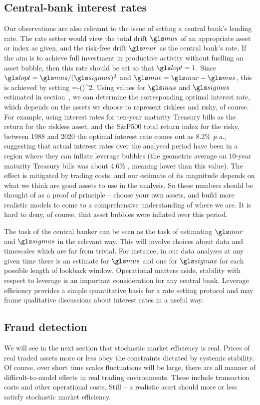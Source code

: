\subsection{Central-bank interest rates}
Our observations are also relevant to the issue of setting a central bank's lending rate. The rate setter would view the total drift $\mus$ of an appropriate asset or index as given, and the risk-free drift $\mur$ as the central bank's rate. If the aim is to achieve full investment in productive activity without fuelling an asset bubble, then this rate should be set so that $\lopt=1$. Since $\lopt=\mus/(\sigmas)^2$ and $\mue=\mur-\mus$, this is achieved by setting 
\be
\mur=\mus-(\sigmas)^2.
\ee
Using values for $\mus$ and $\sigmas$ estimated in section~, we can determine the corresponding optimal interest rate, which depends on the assets we choose to represent riskless and risky, of course. For example, using interest rates for ten-year maturity Treasury bills as the return for the riskless asset, and the S\&P500 total return index for the risky, between 1988 and 2020 the optimal interest rate comes out as 8.2\% {\it p.a.}, suggesting that actual interest rates over the analysed period have been in a region where they can inflate leverage bubbles (the geometric average on 10-year maturity Treasury bills was about 4.6\% \pa, meaning lower than this value). The effect is mitigated by trading costs, and our estimate of its magnitude depends on what we think are good assets to use in the analysis. So these numbers should be thought of as a proof of principle -- choose your own assets, and build more realistic models to come to a comprehensive understanding of where we are. It is hard to deny, of course, that asset bubbles were inflated over this period. 

The task of the central banker can be seen as the task of estimating $\mur$ and $\sigmas$ in the relevant way. This will involve choices about data and timescales which are far from trivial. For instance, in our data analyses at any given time there is an estimate for $\mus$ and one for $\sigmas$ for each possible length of lookback window. Operational matters aside, stability with respect to leverage is an important consideration for any central bank. Leverage efficiency provides a simple quantitative basis for a rate setting protocol and may frame qualitative discussions about interest rates in a useful way.


\subsection{Fraud detection}
We will see in the next section that stochastic market efficiency is real. Prices of real traded assets more or less obey the constraints dictated by systemic stability. Of course, over short time scales fluctuations will be large, there are all manner of difficult-to-model effects in real trading environments. These include transaction costs and other operational costs. Still -- a realistic asset should more or less satisfy stochastic market efficiency.

